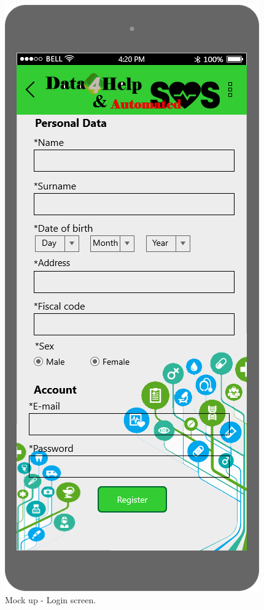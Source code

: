 \begin{figure}[h!]
\begin{minipage}[b]{0.25\textwidth}
    		\caption{Mock up - Login screen.}
  	\end{minipage}
	\hfill
 	\begin{minipage}[b]{0.25\textwidth}
    		\includegraphics[width=\textwidth]{./pictures/user_registration.png}

\end{minipage}
\end{figure}
